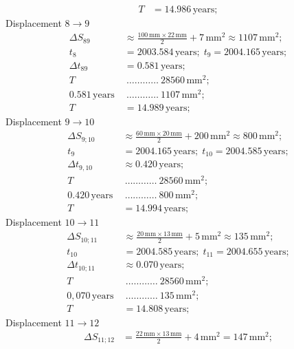\begin{description}
\begin{align*}
    T &= 14.986\,\mathrm{years};
  \end{align*}
  Displacement $8 \rightarrow 9$
  \begin{align*}
    \Delta S_{89} &\approx \frac{100\,\mathrm{mm}\times22\,\mathrm{mm}}{2}
      + 7\,\mathrm{mm}^2 \approx 1107\,\mathrm{mm}^2;\\
    t_8 &= 2003.584\,\mathrm{years};\; t_9 = 2004.165\,\mathrm{years};\\
    \Delta t_{89} &= 0.581\,\mathrm{years};\\
    T\ &\ \dots\dots\dots\dots\ 28560\,\mathrm{mm}^2;\\
    0.581\,\mathrm{years}\ &\ \dots\dots\dots\dots\ 1107\,\mathrm{mm}^2;\\
    T &= 14.989\,\mathrm{years};
  \end{align*}
  Displacement $9 \rightarrow 10$
  \begin{align*}
    \Delta S_{9;10} &\approx \frac{60\,\mathrm{mm}\times20\,\mathrm{mm}}{2}
      + 200\,\mathrm{mm}^2 \approx 800\,\mathrm{mm}^2;\\
    t_9 &= 2004.165\,\mathrm{years};\; t_{10} = 2004.585\,\mathrm{years};\\
    \Delta t_{9,10} &\approx 0.420\,\mathrm{years};\\
    T\ &\ \dots\dots\dots\dots\ 28560\,\mathrm{mm}^2;\\
    0.420\,\mathrm{years}\ &\ \dots\dots\dots\dots\ 800\,\mathrm{mm}^2;\\
    T &= 14.994\,\mathrm{years};
  \end{align*}
  Displacement $10 \rightarrow 11$
  \begin{align*}
    \Delta S_{10;11} &\approx \frac{20\,\mathrm{mm}\times13\,\mathrm{mm}}{2}
      + 5\,\mathrm{mm}^2 \approx 135\,\mathrm{mm}^2;\\
    t_{10} &= 2004.585\,\mathrm{years};\; t_{11} = 2004.655\,\mathrm{years};\\
    \Delta t_{10;11} &\approx 0.070\,\mathrm{years};\\
    T\ &\ \dots\dots\dots\dots\ 28560\,\mathrm{mm}^2;\\
    0{,}070\,\mathrm{years}\ &\ \dots\dots\dots\dots\ 135\,\mathrm{mm}^2;\\
    T &= 14.808\,\mathrm{years};
  \end{align*}
  Displacement $11 \rightarrow 12$
  \begin{align*}
    \Delta S_{11;12} &= \frac{22\,\mathrm{mm}\times13\,\mathrm{mm}}{2}
      + 4\,\mathrm{mm}^2 = 147\,\mathrm{mm}^2;\\

\end{align*}
\end{description}
